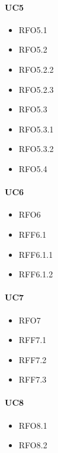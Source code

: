 \paragraph{UC5}
\quad
\begin{multicols}{3}
    \begin{itemize}
        \item RFO5.1
        \item RFO5.2
        \item RFO5.2.2
        \item RFO5.2.3
        \item RFO5.3
        \item RFO5.3.1
        \item RFO5.3.2
        \item RFO5.4
    \end{itemize}
\end{multicols}

\paragraph{UC6}
\quad
\begin{multicols}{3}
    \begin{itemize}
        \item RFO6
        \item RFF6.1
        \item RFF6.1.1
        \item RFF6.1.2
    \end{itemize}
\end{multicols}

\paragraph{UC7}
\quad
\begin{multicols}{3}
    \begin{itemize}
        \item RFO7
        \item RFF7.1
        \item RFF7.2
        \item RFF7.3
    \end{itemize}
\end{multicols}

\paragraph{UC8}
\quad
\begin{multicols}{3}
    \begin{itemize}
        \item RFO8.1
        \item RFO8.2
    \end{itemize}
\end{multicols}

